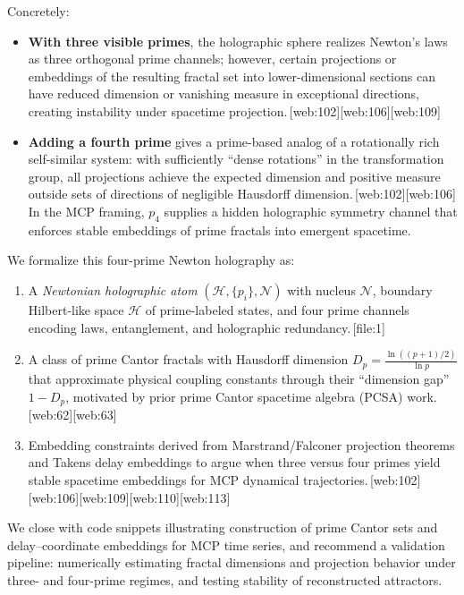 \documentclass[11pt]{article}
\begin{document}
Concretely:
\begin{itemize}[leftmargin=*]
  \item \textbf{With three visible primes}, the holographic sphere realizes Newton's laws as
  three orthogonal prime channels; however, certain projections or embeddings of the
  resulting fractal set into lower-dimensional sections can have reduced dimension
  or vanishing measure in exceptional directions, creating instability
  under spacetime projection.\,[web:102][web:106][web:109]
  \item \textbf{Adding a fourth prime} gives a prime-based analog of
  a rotationally rich self-similar system: with sufficiently ``dense rotations''
  in the transformation group, all projections achieve the expected
  dimension and positive measure outside sets of directions of negligible
  Hausdorff dimension.\,[web:102][web:106]
  In the MCP framing, $p_4$ supplies a hidden holographic symmetry channel that
  enforces stable embeddings of prime fractals into emergent spacetime.
\end{itemize}

We formalize this four-prime Newton holography as:
\begin{enumerate}[leftmargin=*]
  \item A \emph{Newtonian holographic atom} $(\mathcal{H},\{p_i\},\mathcal{N})$ with nucleus
  $\mathcal{N}$, boundary Hilbert-like space $\mathcal{H}$ of prime-labeled states, and
  four prime channels encoding laws, entanglement, and holographic redundancy.\,[file:1]
  \item A class of prime Cantor fractals with Hausdorff dimension
  $D_p = \frac{\ln((p+1)/2)}{\ln p}$ that approximate physical coupling constants through
  their ``dimension gap'' $1-D_p$, motivated by prior prime Cantor spacetime algebra (PCSA)
  work.\,[web:62][web:63]
  \item Embedding constraints derived from Marstrand/Falconer projection theorems and Takens
  delay embeddings to argue when three versus four primes yield stable spacetime embeddings
  for MCP dynamical trajectories.\,[web:102][web:106][web:109][web:110][web:113]
\end{enumerate}

We close with code snippets illustrating construction of prime Cantor sets and delay--coordinate
embeddings for MCP time series, and recommend a validation pipeline:
numerically estimating fractal dimensions and projection behavior under
three- and four-prime regimes, and testing stability of reconstructed
attractors.
\end{document}
